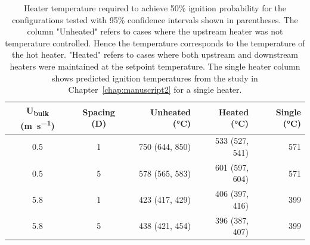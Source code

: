         \begin{table}[hpbt]
            \normalsize
            \caption{Heater temperature required to achieve 50\% ignition probability for the configurations tested with 95\% confidence intervals shown in parentheses. The column "Unheated" refers to cases where the upstream heater was not temperature controlled. Hence the temperature corresponds to the temperature of the hot heater. "Heated" refers to cases where both upstream and downstream heaters were maintained at the setpoint temperature. The single heater column shows predicted ignition temperatures from the study in Chapter~\ref{chap:manuscript2} for a single heater.}
            \centering
            \begin{tabular}{ccrrr}
                \rowcolor{gray!50}
               U\textsubscript{bulk} (\si{\meter\per\second}) & Spacing (D) & Unheated (\si{\celsius})& Heated (\si{\celsius}) & Single (\si{\celsius})\\
                \hline
                0.5  & 1 & 750 (644, 850) & 533 (527, 541) & 571\\
                0.5  & 5 & 578 (565, 583) & 601 (597, 604) & 571\\
                5.8  & 1 & 423 (417, 429) & 406 (397, 416) & 399\\
                5.8  & 5 & 438 (421, 454) & 396 (387, 407) & 399
            \end{tabular}
            \label{tab:multiFiftyTemp}
        \end{table}
        
